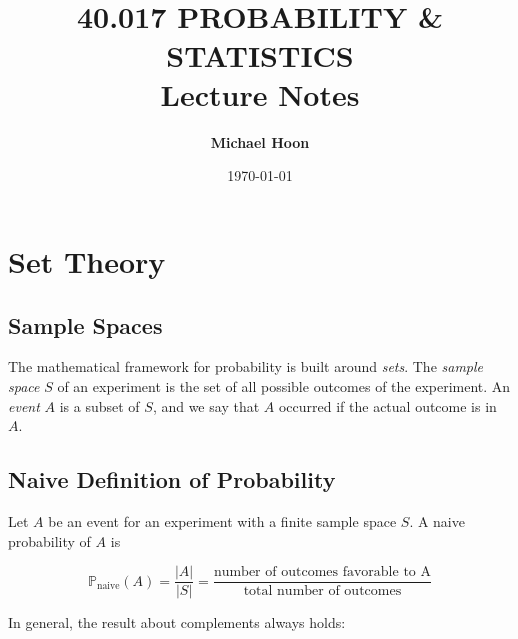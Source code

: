 \documentclass{article}
\begin{document}

\title{ \normalsize \textsc{}
		\\ [2.0cm]
		\HRule{1.5pt} \\
		\LARGE \textbf{\uppercase{40.017 Probability \& Statistics}
		\HRule{2.0pt} \\ [0.6cm] \LARGE{Lecture Notes} \vspace*{10\baselineskip}}
		}
\date{\today}
\author{\textbf{Michael Hoon}}

\maketitle
\newpage

\tableofcontents
\newpage



\section{Set Theory}

\subsection{Sample Spaces}

The mathematical framework for probability is built around \textit{sets}. The \textit{sample space} $S$ of an experiment is the set of all possible outcomes of the experiment. An \textit{event} $A$ is a subset of $S$, and we say that $A$ occurred if the actual outcome is in $A$.  

\subsection{Naive Definition of Probability}

Let $A$ be an event for an experiment with a finite sample space $S$. A naive probability of $A$ is 

\begin{equation}
    \mathbb{P}_{\text{naive}}(A) = \frac{|A|}{|S|} = \frac{\text{number of outcomes favorable to A}}{\text{total number of outcomes}}
\end{equation}

\noindent In general, the result about complements always holds:
\end{document}
